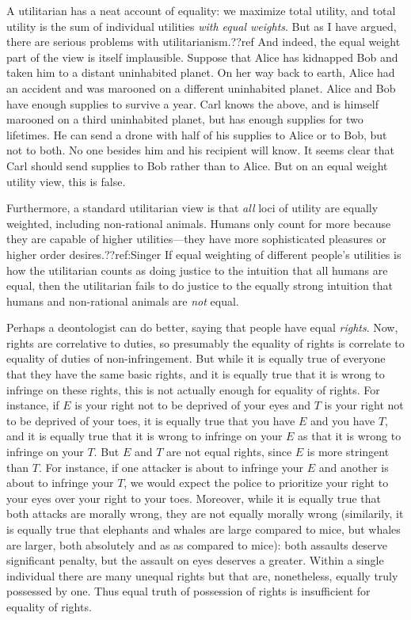 A utilitarian has a neat account of equality: we maximize total utility, and total utility is the sum of
individual utilities \textit{with equal weights}. But as I have argued, there are serious problems with
utilitarianism.??ref And indeed, the equal weight part of the view is itself implausible. Suppose that 
Alice has kidnapped Bob and taken him to a distant uninhabited planet. On her way back to earth, Alice 
had an accident and was marooned on a different uninhabited planet. Alice and Bob have enough supplies to
survive a year. Carl knows the above, and is himself marooned on a third uninhabited planet, but has enough 
supplies for two lifetimes. He can send a drone with half of his supplies to Alice or to Bob, but not to
both. No one besides him and his recipient will know. It seems clear that Carl should send supplies to
Bob rather than to Alice. But on an equal weight utility view, this is false.

Furthermore, a standard utilitarian view is that \textit{all} loci of utility are equally weighted, including
non-rational animals. Humans only count for more because they are capable of higher utilities---they have more
sophisticated pleasures or higher order desires.??ref:Singer If equal weighting of different people's utilities
is how the utilitarian counts as doing justice to the intuition that all humans are equal, then the utilitarian
fails to do justice to the equally strong intuition that humans and non-rational animals are \textit{not} equal.

Perhaps a deontologist can do better, saying that people have equal \textit{rights}. Now, rights are correlative to 
duties, so presumably the
equality of rights is correlate to equality of duties of non-infringement. But while it is 
equally true of everyone that they have the same basic rights, and it is equally true that it is
wrong to infringe on these rights, this is not actually enough for equality of rights. For instance, 
if $E$ is your right not to be deprived of your eyes and $T$ is your right not to be deprived of your toes, 
it is equally true that you have $E$ and you have $T$, and it is equally true that it is wrong to 
infringe on your $E$ as that it is wrong to infringe on your $T$. But $E$ and $T$ are not equal rights, since
$E$ is more stringent than $T$. For instance, if one attacker is about to infringe your $E$ and another is about
to infringe your $T$, we would expect the police to prioritize your right to your eyes over your right to your
toes. Moreover, while it is equally true that both attacks are morally wrong, they are not equally morally wrong 
(similarily, it is equally true that elephants and whales are large compared to mice, but whales are larger, both
absolutely and as as compared to mice): both assaults deserve significant penalty, but the assault on eyes deserves
a greater. Within a single individual there are many unequal rights but that are, nonetheless, equally truly possessed
by one. Thus equal truth of possession of rights is insufficient for equality of rights.

